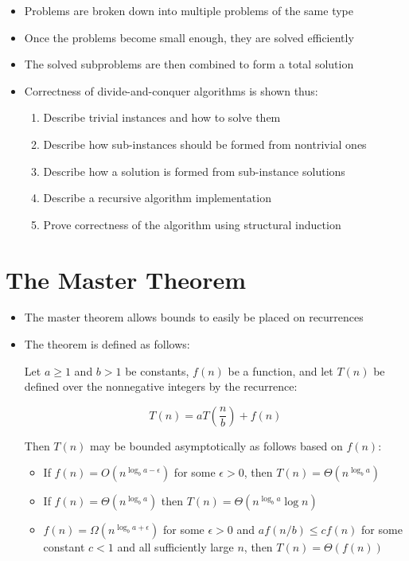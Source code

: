 \documentclass{article}
\begin{document}
\begin{itemize}
\item Problems are broken down into multiple problems of the same type
\item Once the problems become small enough, they are solved efficiently
\item The solved subproblems are then combined to form a total solution
\item Correctness of divide-and-conquer algorithms is shown thus:
\begin{enumerate}
\item Describe trivial instances and how to solve them
\item Describe how sub-instances should be formed from nontrivial ones
\item Describe how a solution is formed from sub-instance solutions
\item Describe a recursive algorithm implementation
\item Prove correctness of the algorithm using structural induction
\end{enumerate}
\end{itemize}

\section{The Master Theorem}

\begin{itemize}
\item The master theorem allows bounds to easily be placed on recurrences
\item The theorem is defined as follows:

Let $a \geq 1$ and $b > 1$ be constants, $f(n)$ be a function, and let $T(n)$
be defined over the nonnegative integers by the recurrence:

\begin{equation*}
T(n) = aT \left( \frac{n}{b} \right) +f(n)
\end{equation*}

Then $T(n)$ may be bounded asymptotically as follows based on $f(n)$:

\begin{itemize}
\item If $f(n) = O(n^{\log_ba-\epsilon})$ for some $\epsilon > 0$, then $T(n) =
\Theta(n^{\log_ba})$
\item If $f(n) = \Theta(n^{\log_ba})$ then $T(n) = \Theta(n^{\log_ba}\log n)$
\item $f(n) = \Omega(n^{\log_ba+\epsilon})$ for some $\epsilon > 0$ and
$af(n/b) \leq cf(n)$ for some constant $c<1$ and all sufficiently large $n$,
then $T(n) = \Theta(f(n))$
\end{itemize}


\end{itemize}
\end{document}
